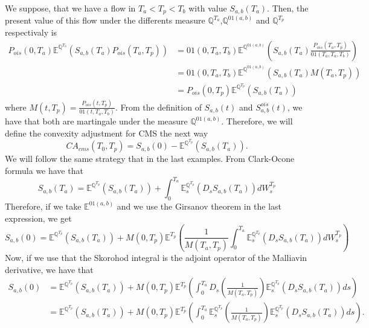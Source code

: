 \documentclass[a4paper,10pt]{article}
\newcommand{\1}{\mathbf{1}}
\begin{document}
We suppose, that we have a flow in $T_a < T_p < T_b$ with value $S_{a,b}(T_a)$. Then, the present value of this flow under the differents measure $\mathbb{Q}^{T_a}$,$\mathbb{Q}^{01(a,b)}$ and $\mathbb{Q}^{T_p}$ respectivaly is 
\begin{align}\label{cms_expedted_value}
P_{ois}(0,T_a)\mathbb{E}^{\mathbb{Q}^{T_{a}}}\left(S_{a,b}(T_a) P_{ois}(T_a,T_p) \right) &= 01(0,T_a,T_b) \mathbb{E}^{\mathbb{Q}^{01(a,b)}}\left(S_{a,b}(T_a) \frac{P_{ois}(T_a,T_p)}{01(T_a,T_a,T_b) }\right) \nonumber \\
&= 01(0,T_a,T_b) \mathbb{E}^{\mathbb{Q}^{01(a,b)}}\left(S_{a,b}(T_a) M(T_a,T_p)\right) \\
&=P_{ois}(0,T_p)\mathbb{E}^{\mathbb{Q}^{T_p}}\left(S_{a,b}(T_a)\right)
\end{align}
where $M(t, T_p)= \frac{P_{ois}(t,T_p) }{01(t,T_a,T_b)} $. From the definition of $S_{a,b}(t)$ and $S^{ois}_{a,b}(t)$, we have that both are martingale under the measure $\mathbb{Q}^{01(a,b)}$. Therefore, we will define the convexity adjustment for CMS the next  way
\begin{equation*}
CA_{cms}(T_0,T_p) = S_{a,b}(0) - \mathbb{E}^{\mathbb{Q}^{T_p}}\left(S_{a,b}(T_a)\right). 
\end{equation*}
We will follow the same strategy that in the last examples. From Clark-Ocone formula we have that
\begin{equation*}
S_{a,b}(T_a) = \mathbb{E}^{\mathbb{Q}^{T_p}}\left(S_{a,b}(T_a)\right) + \int_{0}^{T_a} \mathbb{E}_s^{\mathbb{Q}^{T_p}}\left(D_s S_{a,b}(T_a)\right) dW^{T_p}_s 
\end{equation*} 
Therefore, if we take $\mathbb{E}^{01(a,b)}$ and we use the Girsanov theorem  in the last expression, we get 
\begin{equation*}
S_{a,b}(0) = \mathbb{E}^{\mathbb{Q}^{T_p}}\left(S_{a,b}(T_a)\right) + M(0,T_p) \mathbb{E}^{T_p}\left( \frac{1}{M(T_a,T_p)} \int_{0}^{T_a} \mathbb{E}_s^{\mathbb{Q}^{T_p}}\left(D_s S_{a,b}(T_a)\right) dW^{T_p}_s \right)
\end{equation*}
Now, if we use that the Skorohod integral is the adjoint operator of the Malliavin derivative, we have that
\begin{align*}
S_{a,b}(0) &= \mathbb{E}^{\mathbb{Q}^{T_p}}\left(S_{a,b}(T_a)\right) + M(0,T_p) \mathbb{E}^{T_p}\left(\int_{0}^{T_a} D_s \left(\frac{1}{M(T_a,T_p)} \right) \mathbb{E}_s^{\mathbb{Q}^{T_p}}\left(D_s S_{a,b}(T_a)\right) ds  \right) \\
&=\mathbb{E}^{\mathbb{Q}^{T_p}}\left(S_{a,b}(T_a)\right) + M(0,T_p) \mathbb{E}^{T_p}\left(\int_{0}^{T_a} \mathbb{E}_s^{\mathbb{Q}^{T_p}}\left(\frac{1}{M(T_a,T_p)} \right) \mathbb{E}_s^{\mathbb{Q}^{T_p}}\left(D_s S_{a,b}(T_a)\right) ds  \right).
\end{align*}
\end{document}
